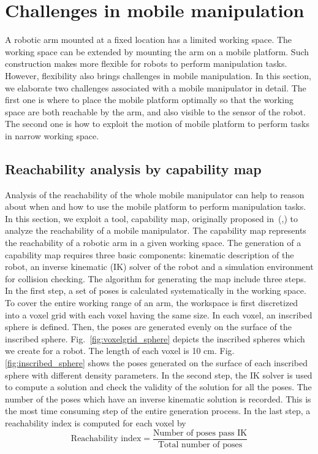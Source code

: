 \section{Challenges in mobile manipulation} \label{sec:challengesmb}
A robotic arm mounted at a fixed location has a limited working space. The working space can be extended by mounting the arm on a mobile platform. Such construction makes more flexible for robots to perform manipulation tasks. However, flexibility also brings challenges in mobile manipulation. In this section, we elaborate two challenges associated with a mobile manipulator in detail. The first one is where to place the mobile platform optimally so that the working space are both reachable by the arm, and also visible to the sensor of the robot. The second one is how to exploit the motion of mobile platform to perform tasks in narrow working space. 
  
\subsection{Reachability analysis by capability map}
Analysis of the reachability of the whole mobile manipulator can help to reason about when and how to use the mobile platform to perform manipulation tasks. In this section, we exploit a tool, capability map, originally proposed in~(\cite{Zacharias2013},\cite{Zacharias2007}) to analyze the reachability of a mobile manipulator. The capability map represents the reachability of a robotic arm in a given working space. The generation of a capability map requires three basic components: kinematic description of the robot, an inverse kinematic (IK) solver of the robot and a simulation environment for collision checking. The algorithm for generating the map include three steps. In the first step, a set of poses is calculated systematically in the working space. To cover the entire working range of an arm, the workspace is first discretized into a voxel grid with each voxel having the same size. In each voxel, an inscribed sphere is defined. Then, the poses are generated evenly on the surface of the inscribed sphere. Fig.~\ref{fig:voxelgrid_sphere} depicts the inscribed spheres which we create for a robot. The length of each voxel is 10 cm. Fig.\ref{fig:inscribed_sphere} shows the poses generated on the surface of each inscribed sphere with different density parameters.  In the second step, the IK solver is used to compute a solution and check the validity of the solution for all the poses. The number of the poses which have an inverse kinematic solution is recorded. This is the most time consuming step of the entire generation process. In the last step, a reachability index is computed for each voxel by 
\begin{equation}
\text{Reachability index} = \frac{ \text{Number of poses pass IK} }{ \text{Total number of poses} }   
\end{equation}

